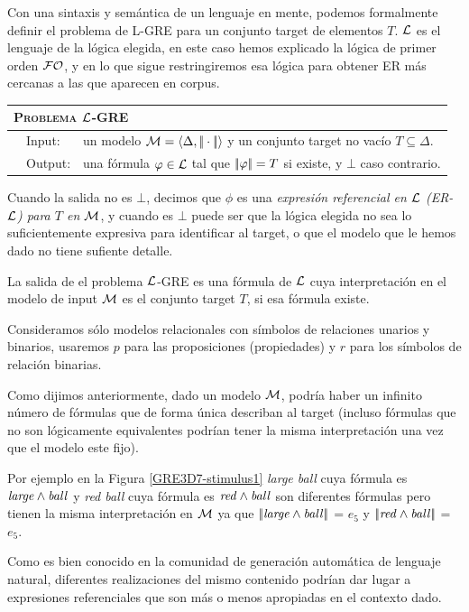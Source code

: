 Con una sintaxis y sem\'antica de un lenguaje en mente, podemos formalmente definir el problema de L-GRE para un conjunto target de elementos $T$. $\mathcal{L}$ es el lenguaje de la l\'ogica elegida, en este caso hemos explicado la l\'ogica de primer orden $\mathcal{FO}$, y en lo que sigue restringiremos esa l\'ogica para obtener ER m\'as cercanas a las que aparecen en corpus.

\medskip
\noindent
{\small
\begin{center}
\begin{tabular}{ll} \hline
\multicolumn{2}{l}{
\textsc{Problema $\mathcal{L}$-GRE }}\\ \hline
\ \ Input: & un modelo $\mathcal{M}=\langle \Delta,|\!|\cdot|\!| \rangle$ y un conjunto target no vac\'io $T \subseteq \Delta$.\\
\ \ Output: & una f\'ormula $\varphi \in \mathcal{L}$ tal que
$|\!|\varphi|\!| = T$ si existe, y $\bot$ caso contrario.\\ \hline
\end{tabular}
\end{center}}
Cuando la salida no es $\bot$, decimos que $\phi$ es una
\emph{expresi\'on referencial en $\mathcal{L}$ (ER-$\mathcal{L}$) para $T$ en $\mathcal{M}$}, y cuando es $\bot$ puede ser que la l\'ogica elegida no sea lo suficientemente expresiva para identificar al target, o que el modelo que le hemos dado no tiene sufiente detalle.

La salida de el problema $\mathcal{L}$-GRE es una f\'ormula de
$\mathcal{L}$ cuya interpretaci\'on en el modelo de input $\mathcal{M}$ es el conjunto target $T$, si
esa f\'ormula existe. 

Consideramos s\'olo modelos relacionales con s\'imbolos de relaciones unarios y binarios, usaremos $p$ para las proposiciones (propiedades) y $r$ para los s\'imbolos de relaci\'on binarias.

Como dijimos anteriormente, dado un modelo $\mathcal{M}$, podr\'ia haber un infinito n\'umero de f\'ormulas que de forma \'unica
describan al target (incluso f\'ormulas que no son l\'ogicamente equivalentes podr\'ian tener
la misma interpretaci\'on una vez que el modelo este fijo). 

Por ejemplo en la Figura \ref{GRE3D7-stimulus1} {\it large ball} cuya f\'ormula es $\mathit{large} \land \mathit{ball}$ y {\it red ball} cuya f\'ormula es $\mathit{red} \land \mathit{ball}$ son diferentes f\'ormulas pero tienen la misma interpretaci\'on en $\mathcal{M}$ ya que $|\!|\mathit{large} \land \mathit{ball}|\!|$ = $e_5$ y $|\!|\mathit{red} \land \mathit{ball}|\!|$ = $e_5$.

Como es bien conocido en la comunidad de generaci\'on autom\'atica de lenguaje natural, diferentes
realizaciones del mismo contenido podr\'ian dar lugar a expresiones referenciales que son m\'as o menos
apropiadas en el contexto dado. 

